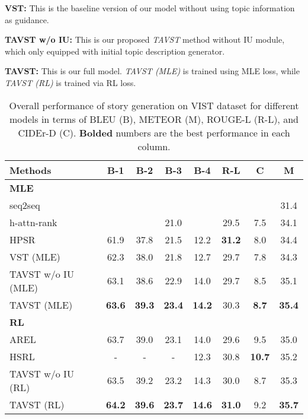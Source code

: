 \documentclass[11pt]{article}
\newcommand{\citep}{\cite}
\begin{document}
\textbf{VST:} This is the baseline version of our model without using topic information as guidance.

\textbf{TAVST w/o IU:} This is our proposed \emph{TAVST} method without IU module, which only equipped with initial topic description generator. 

\textbf{TAVST:} This is our full model. \emph{TAVST (MLE)} is trained using MLE loss, while \emph{TAVST (RL)} is trained via RL loss. 



{\begin{table*}[t!]
\centering
		\begin{tabular}{lccccccc}
			\hline
			Methods & B-1&B-2&B-3&B-4&R-L&C&M\\
			\hline
			\multicolumn{7}{l}{\textbf{MLE}} \\
			\hline
			seq2seq \citep{huang2016visual} &  &  &  &  &  &  & 31.4\\
			h-attn-rank \citep{yu2017hierarchically} &  &  & 21.0 &  & 29.5 & 7.5 & 34.1\\
			HPSR \citep{wang2019hierarchical} & 61.9 & 37.8 & 21.5  & 12.2 & \textbf{31.2} & 8.0 & 34.4\\
			\hline
			VST (MLE) & 62.3 & 38.0 & 21.8  & 12.7 & 29.7 & 7.8 & 34.3\\
            TAVST w/o IU (MLE)  & 63.1 & 38.6 & 22.9 & 14.0 & 29.7 & 8.5 & 35.1\\
            TAVST (MLE) & \textbf{63.6} & \textbf{39.3} & \textbf{23.4} & \textbf{14.2} & 30.3 & \textbf{8.7} & \textbf{35.4}\\
            \hline
			\multicolumn{7}{l}{\textbf{RL}} \\
			\hline
			AREL \citep{Wang:2018tda} & 63.7 & 39.0 & 23.1  & 14.0 & 29.6 & 9.5 & 35.0\\
			HSRL \citep{huang2019hierarchically} & - & - & -  & 12.3 & 30.8 & \textbf{10.7} & 35.2\\
			\hline
TAVST w/o IU (RL)  & 63.5 & 39.2 & 23.2 & 14.3 & 30.0 & 8.7 & 35.3\\
			TAVST (RL) & \textbf{64.2} & \textbf{39.6} & \textbf{23.7} & \textbf{14.6} & \textbf{31.0} & 9.2 & \textbf{35.7}\\
			\hline
		\end{tabular}
		\caption{ Overall performance of story generation on VIST dataset for different models in terms of BLEU (B), METEOR (M), ROUGE-L (R-L), and CIDEr-D (C). \textbf{Bolded} numbers are the best performance in each column.}
\label{table:automatic-eval}
		\vspace{-2mm}
	\end{table*}
}
\end{document}
